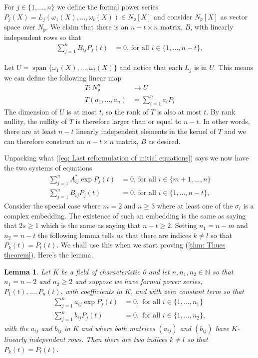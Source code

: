 \documentclass{article}
\newcommand{\Span}{\operatorname{span}}
\newtheorem{lemma}{Lemma}[section]
\newcommand{\mfrak}[1]{\mathfrak{#1}}
\newcommand{\mbb}[1]{\mathbb{#1}}
\begin{document}
For $j \in \{1, ..., n\}$ we define the formal power series $P_j(X) = L_j(\omega_1(X), ..., \omega_t(X))\in N_\mfrak p[X]$ and consider $N_\mfrak p[X]$ as vector space over $N_\mfrak p$. We claim that there is an $n-t \times n$ matrix, $B$, with linearly independent rows so that
\begin{align*}
    \sum_{j=1}^n B_{ij}P_j(t) &= 0 \text{, for all } i \in \{1,  ..., n-t\},
\end{align*}

Let $U = \Span \{ \omega_1(X), ..., \omega_t(X) \}$ and notice that each $L_j$ is in $U$. This means we can define the following linear map
\begin{align*}
    T : N_\mfrak p^n &\to U \\
    T(a_1, ..., a_n) &= \sum_{i = 1}^n a_i P_i
\end{align*}
The dimension of $U$ is at most $t$, so the rank of $T$ is also at most $t$. By rank nullity, the nullity of $T$ is therefore larger than or equal to $n-t$. In other words, there are at least $n-t$ linearly independent elements in the kernel of $T$ and we can therefore construct an $n-t \times n$ matrix, $B$ as desired.

Unpacking what (\ref{eq: Last reformulation of initial equations}) says we now have the two systems of equations
\begin{align}\label{eq: System that can also be solved}
    \sum_{j=1}^n A^*_{ij}\exp P_j(t) &= 0 \text{, for all } i \in \{ m+1, ..., n \} \\
    \sum_{j=1}^n B_{ij}P_j(t) &= 0 \text{, for all } i \in \{1,  ..., n-t\},
  \end{align}
Consider the special case where $m = 2$ and $n \geq 3$ where at least one of the $\sigma_i$ is a complex embedding. The existence of such an embedding is the same as saying that $2s \geq 1$ which is the same as saying that $n - t \geq 2$. Setting $n_1 = n-m$ and $n_2 = n-t$ the following lemma tells us that there are indices $k \neq l$ so that $P_k(t) = P_l(t)$. We shall use this when we start proving (\ref{thm: Thues theorem}). Here's the lemma.

  \begin{lemma} \label{lem: Two power series are equal}
    Let $K$ be a field of characteristic 0 and let $n,n_1,n_2 \in \mbb N$ so that $n_1 = n - 2$ and $n_2 \geq 2$ and suppose we have formal power series, $P_1(t), ..., P_n(t)$, with coefficients in $K$, and with zero constant term so that
    \begin{align*}
        \sum_{j = 1}^n a_{ij} \exp P_j(t) &= 0, \text{ for all } i \in \{1, ..., n_1\} \\
        \sum_{j = 1}^n b_{ij} P_j(t) &= 0, \text{ for all } i \in \{1, ..., n_2\},
    \end{align*}
    with the $a_{ij}$ and $b_{ij}$ in $K$ and where both matrices $(a_{ij})$ and $(b_{ij})$ have $K$-linearly independent rows. Then there are two indices $k \neq l$ so that $P_k(t) = P_l(t)$.
\end{lemma}
\end{document}
